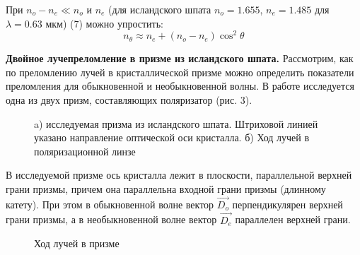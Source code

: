 \documentclass[14pt]{article}
\begin{document}
При $n_o - n_e \ll n_o $ и $n_e$ (для исландского шпата $n_o = 1.655$, $n_e = 1.485$ для $\lambda = 0.63$ мкм) (7) можно упростить:
\begin{equation}
	n_\theta \approx n_e + (n_o - n_e)\cos^2\theta
\end{equation}

\textbf{Двойное лучепреломление в призме из исландского шпата.}
Рассмотрим, как по преломлению лучей в кристаллической призме можно
определить показатели преломления для обыкновенной и необыкновенной волны.
В работе исследуется одна из двух призм, составляющих поляризатор (рис. 3).

\begin{figure}[h!]
	\caption{a) исследуемая призма из исландского шпата. Штриховой линией указано направление оптической оси кристалла. б) Ход лучей в поляризационной линзе}
	\label{fig:image}
\end{figure}

В исследуемой призме ось кристалла лежит в плоскости, параллельной
верхней грани призмы, причем она параллельна входной грани призмы (длинному катету). При этом в обыкновенной волне вектор
$\vec{D_o}$ перпендикулярен верхней грани призмы,
а в необыкновенной волне вектор $\vec{D_e}$ параллелен верхней грани.

\begin{figure}[h!]
	\caption{Ход лучей в призме}
	\label{fig:image}
\end{figure}
\end{document}
